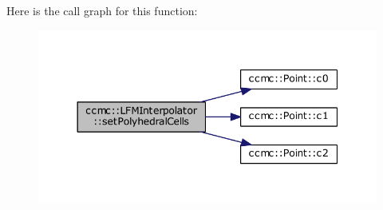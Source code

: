 Here is the call graph for this function\-:
\nopagebreak
\begin{figure}[H]
\begin{center}
\leavevmode
\includegraphics[width=344pt]{classccmc_1_1_l_f_m_interpolator_a74c1ba35f8eaece3f44393538c23300d_cgraph}
\end{center}
\end{figure}




